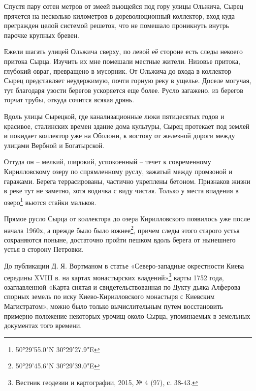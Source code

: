 \newpage

Спустя пару сотен метров от змеей вьющейся под гору улицы Ольжича, Сырец прячется на несколько километров в дореволюционный коллектор, вход куда прегражден целой системой решеток, что не помешало проникнуть внутрь парочке крупных бревен.

Ежели шагать улицей Ольжича сверху, по левой её стороне есть следы некоего притока Сырца. Изучить их мне помешали местные жители. Низовье притока, глубокий овраг, превращено в мусорник. От Ольжича до входа в коллектор Сырец представляет неудержимую, почти горную реку в ущелье. Доселе могучая, тут благодаря узости берегов ускоряется еще более. Русло загажено, из берегов торчат трубы, откуда сочится всякая дрянь. 

Вдоль улицы Сырецкой, где канализационные люки пятидесятых годов и красивое, сталинских времен здание дома культуры, Сырец протекает под землей и покидает коллектор уже на Оболони, к востоку от железной дороги между улицами Вербной и Богатырской.

Оттуда он – мелкий, широкий, успокоенный – течет к современному Кирилловскому озеру по спрямленному руслу, зажатый между промзоной и гаражами. Берега террасированы, частично укреплены бетоном. Признаков жизни в реке тут не заметно, хотя водичка с виду чистая. Только у места впадения в озеро\footnote{50°29'55.0"N 30°29'27.9"E} вьются стайки мальков.

Прямое русло Сырца от коллектора до озера Кирилловского появилось уже после начала 1960х, а прежде было было южнее\footnote{50°29'45.6"N 30°29'39.0"E}, причем следы этого старого устья сохраняются поныне, достаточно пройти пешком вдоль берега от нынешнего устья в сторону Петровки.




До публикации Д. Я. Вортманом в статье «Северо-западные окрестности Киева середины XVIII в. на картах монастырских владений»\footnote{Вестник геодезии и картографии, 2015, № 4 (97), с. 38-43.} карты 1752 года, озаглавленной «Карта снятая и свидетельствованная по Дукту дьяка Алферова спорных земель по иску Киево-Кирилловского монастыря с Киевским Магистратом», можно было только вычислительным путем восстановить примерно положение некоторых урочищ около Сырца, упоминаемых в земельных документах того времени.

